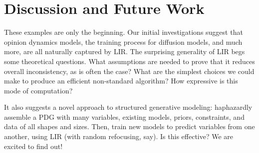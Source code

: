 

%



\section{Discussion and Future Work}

These examples are only the beginning.
Our initial investigations suggest that
opinion dynamics models,
the training process for diffusion models,
and much more, are all naturally captured by LIR.
%
The surprising generality of LIR begs some theoretical questions.
What assumptions are needed to prove that it reduces overall inconsistency,
    as is often the case?
    What are the simplest choices we could make to produce an efficient
        non-standard algorithm?
    How expressive is this mode of computation?

It also
suggests a novel approach to structured generative modeling:
haphazardly assemble a PDG with many variables, existing models, priors,
    constraints, and data of all shapes and sizes.
Then, train new models to predict variables from one another,
    using LIR (with random refocusing, say).
Is this effective?  We are excited to find out!

